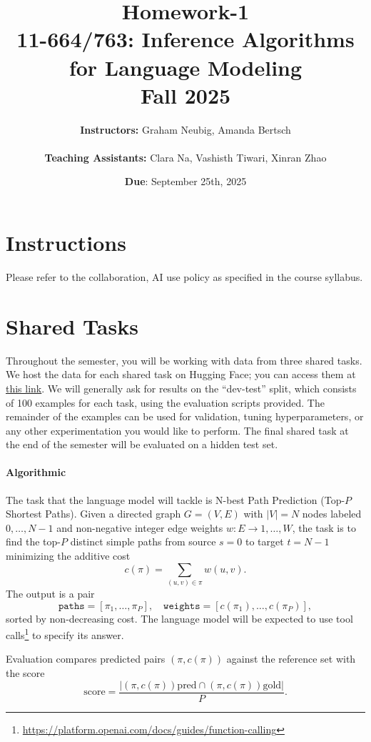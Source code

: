 \documentclass{article}
\title{Homework-1 \\
11-664/763: Inference Algorithms for Language Modeling\\
Fall 2025}
\author{
    \textbf{Instructors:} Graham Neubig, Amanda Bertsch \\
    \\
    \textbf{Teaching Assistants:} Clara Na, Vashisth Tiwari, Xinran Zhao
}
\date{\textbf{Due}: September 25th, 2025}
\begin{document}
\maketitle

\section*{Instructions}

Please refer to the collaboration, AI use policy as specified in the course syllabus.

\section{Shared Tasks}
Throughout the semester, you will be working with data from three shared tasks. We host the data for each shared task on Hugging Face; you can access them at \href{https://huggingface.co/datasets/vashistht/11763_datasets}{this link}. We will generally ask for results on the ``dev-test'' split, which consists of 100 examples for each task, using the evaluation scripts provided. The remainder of the examples can be used for validation, tuning hyperparameters, or any other experimentation you would like to perform. The final shared task at the end of the semester will be evaluated on a hidden test set.

\paragraph{Algorithmic}

The task that the language model will tackle is N-best Path Prediction (Top-$P$ Shortest Paths).
Given a directed graph $G=(V,E)$ with $|V|=N$ nodes labeled $0,\dots,N-1$ and non-negative integer edge weights $w:E\to{1,\dots,W}$, the task is to find the top-$P$ distinct simple paths from source $s=0$ to target $t=N-1$ minimizing the additive cost
\begin{equation}
c(\pi)=\sum_{(u,v)\in \pi} w(u,v).
\end{equation}
The output is a pair
\begin{equation}
\texttt{paths}=[\pi_1,\dots,\pi_P],\quad \texttt{weights}=[c(\pi_1),\dots,c(\pi_P)],
\end{equation}
sorted by non-decreasing cost.
The language model will be expected to use tool calls\footnote{\url{https://platform.openai.com/docs/guides/function-calling}} to specify its answer.

Evaluation compares predicted pairs $(\pi,c(\pi))$ against the reference set with the score
\begin{equation}
\mathrm{score}=\frac{\left| {(\pi,c(\pi))}{\text{pred}} \cap {(\pi,c(\pi))}{\text{gold}} \right|}{P}.
\end{equation}
\end{document}
